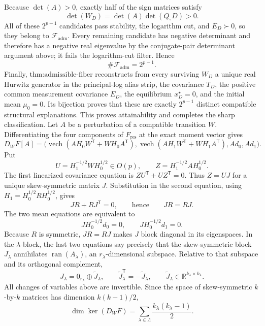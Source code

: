 Because \(\det(A)>0\), exactly half of the sign matrices satisfy
\[
 \det(W_D)=\det(A)\det(Q_\circ D)>0.
\]
All of these \(2^{p-1}\) candidates pass stability, the logarithm cut, and \(E_D\succ0\), so they belong to \(\mathcal F_{\mathrm{adm}}\).  Every remaining candidate has negative determinant and therefore has a negative real eigenvalue by the conjugate-pair determinant argument above; it fails the logarithm-cut filter.  Hence
\[
 \#\mathcal F_{\mathrm{adm}}=2^{p-1}.
\]
Finally, \(\text{thm:admissible-fiber}\) reconstructs from every surviving \(W_D\) a unique real Hurwitz generator in the principal-log alias strip, the covariance \(T_D\), the positive common measurement covariance \(E_D\), the equilibrium \(x_D^\star=0\), and the initial mean \(\mu_0=0\).  Its bijection proves that these are exactly \(2^{p-1}\) distinct compatible structural explanations.  This proves attainability and completes the sharp classification.
Let \(A\) be a perturbation of a compatible transition \(W\).  Differentiating the four components of \(F_{\mathrm{res}}\) at the exact moment vector gives
\[
 D_WF[A]=\bigl(\operatorname{vech}(AH_0W^{\mathsf T}+WH_0A^{\mathsf T}),
 \operatorname{vech}(AH_1W^{\mathsf T}+WH_1A^{\mathsf T}),Ad_0,Ad_1\bigr).
\]
Put
\[
 U=H_1^{-1/2}WH_0^{1/2}\in O(p),
 \qquad
 Z=H_1^{-1/2}AH_0^{1/2}.
\]
The first linearized covariance equation is \(ZU^{\mathsf T}+UZ^{\mathsf T}=0\).  Thus \(Z=UJ\) for a unique skew-symmetric matrix \(J\).  Substitution in the second equation, using \(H_1=H_0^{1/2}RH_0^{1/2}\), gives
\[
 JR+RJ^{\mathsf T}=0,
 \qquad\text{hence}\qquad JR=RJ.
\]
The two mean equations are equivalent to
\[
 JH_0^{-1/2}d_0=0,
 \qquad
 JH_0^{-1/2}d_1=0.
\]
Because \(R\) is symmetric, \(JR=RJ\) makes \(J\) block diagonal in its eigenspaces.  In the \(\lambda\)-block, the last two equations say precisely that the skew-symmetric block \(J_\lambda\) annihilates \(\operatorname{ran}(A_\lambda)\), an \(r_\lambda\)-dimensional subspace.  Relative to that subspace and its orthogonal complement,
\[
 J_\lambda=0_{r_\lambda}\oplus \widetilde J_\lambda,
 \qquad
 \widetilde J_\lambda^{\mathsf T}=-\widetilde J_\lambda,
 \qquad
 \widetilde J_\lambda\in\mathbb R^{k_\lambda\times k_\lambda}.
\]
All changes of variables above are invertible.  Since the space of skew-symmetric \(k\)-by-\(k\) matrices has dimension \(k(k-1)/2\),
\[
 \dim\ker(D_WF)=\sum_{\lambda\in\Lambda}\frac{k_\lambda(k_\lambda-1)}2.
\]

